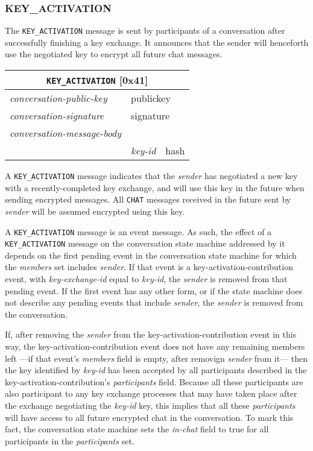 \documentclass{article}
\def\npmessage#1{\texttt{#1}}
\def\field#1{\textit{#1}}
\def\smfield#1{\textsl{#1}}
\def\type#1{\textsf{#1}}
\newenvironment{conversationmessage}[2]{
\newcommand{\messagefield}[2]{
& \field{##1} & \type{##2} \\
\hline
}
\hspace{2em minus 2em}\begin{tabular}{|l|l|l|}
\hline
\multicolumn{3}{|c|}{\npmessage{#1} [#2]} \\
\hline
\hline
\field{conversation-public-key} & \multicolumn{2}{l|}{\type{publickey}} \\
\hline
\field{conversation-signature} & \multicolumn{2}{l|}{\type{signature}} \\
\hline
\field{conversation-message-body} & \multicolumn{2}{l|}{} \\
\hline
}{
\end{tabular}
}
\begin{document}
\subsubsection{KEY\_ACTIVATION}
\label{sec:messages/key-activation}

The \npmessage{KEY\_ACTIVATION} message is sent by participants of a conversation after successfully finishing a key exchange.
It announces that the sender will henceforth use the negotiated key to encrypt all future chat messages.

\begin{conversationmessage}{KEY\_ACTIVATION}{0x41}
\messagefield{key-id}{hash}
\end{conversationmessage}

A \npmessage{KEY\_ACTIVATION} message indicates that the \field{sender} has negotiated a new key with a recently-completed key exchange, and will use this key in the future when sending encrypted messages.
All \npmessage{CHAT} messages received in the future sent by \field{sender} will be assumed encrypted using this key.

A \npmessage{KEY\_ACTIVATION} message is an event message.
As such, the effect of a \npmessage{KEY\_ACTIVATION} message on the conversation state machine addressed by it depends on the first pending event in the conversation state machine for which the \smfield{members} set includes \field{sender}.
If that event is a \type{key-activation-contribution} event, with \smfield{key-exchange-id} equal to \field{key-id}, the \field{sender} is removed from that pending event.
If the first event has any other form, or if the state machine does not describe any pending events that include \field{sender}, the \field{sender} is removed from the conversation.

If, after removing the \field{sender} from the \type{key-activation-contribution} event in this way, the \type{key-activation-contribution} event does not have any remaining members left ---if that event's \smfield{members} field is empty, after removign \field{sender} from it--- then the key identified by \field{key-id} has been accepted by all participants described in the \type{key-activation-contribution}'s \smfield{participants} field.
Because all these participants are also participant to any key exchange processes that may have taken place after the exchange negotiating the \field{key-id} key, this implies that all these \smfield{participants} will have access to all future encrypted chat in the conversation.
To mark this fact, the conversation state machine sets the \smfield{in-chat} field to \textsf{true} for all participants in the \smfield{participants} set.
\end{document}
